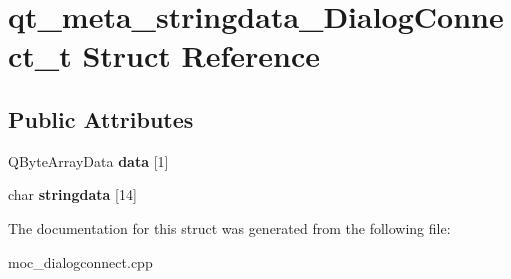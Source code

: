 \hypertarget{structqt__meta__stringdata__DialogConnect__t}{\section{qt\-\_\-meta\-\_\-stringdata\-\_\-\-Dialog\-Connect\-\_\-t Struct Reference}
\label{structqt__meta__stringdata__DialogConnect__t}
}
\subsection*{Public Attributes}
\begin{DoxyCompactItemize}
\item 
\hypertarget{structqt__meta__stringdata__DialogConnect__t_a0ab7f8fce8456f77c0d6ea0d35155316}{Q\-Byte\-Array\-Data {\bfseries data} \mbox{[}1\mbox{]}}\label{structqt__meta__stringdata__DialogConnect__t_a0ab7f8fce8456f77c0d6ea0d35155316}

\item 
\hypertarget{structqt__meta__stringdata__DialogConnect__t_a54dac0a9007c1df2e24c6a9a2f97508d}{char {\bfseries stringdata} \mbox{[}14\mbox{]}}\label{structqt__meta__stringdata__DialogConnect__t_a54dac0a9007c1df2e24c6a9a2f97508d}

\end{DoxyCompactItemize}


The documentation for this struct was generated from the following file\-:\begin{DoxyCompactItemize}
\item 
moc\-\_\-dialogconnect.\-cpp\end{DoxyCompactItemize}
